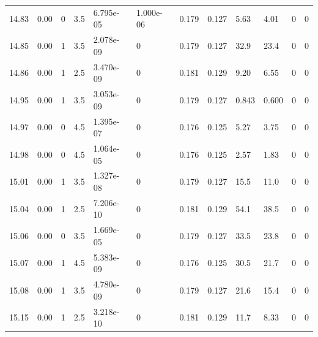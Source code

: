 \documentclass[preview]{standalone}
\begin{document}
{{{{{{{{{{{{{{\begin{tabular}{L{1.2cm}C{1.2cm} C{0.3cm}C{0.5cm} C{1.4cm}C{1.4cm} C{1.4cm}C{1.4cm} C{1.6cm}C{1.6cm} C{1.6cm}C{1.6cm}}
  14.83  &  0.00  & 0     & 3.5 &  6.795e-05  & 1.000e-06  &  0.179&   0.127& 5.63 & 4.01   &  0 & 0  \\ 
  14.85  &  0.00  & 1     & 3.5 &  2.078e-09  & 0  &  0.179&   0.127& 32.9 & 23.4   &  0 & 0  \\ 
  14.86  &  0.00  & 1     & 2.5 &  3.470e-09  & 0  &  0.181&   0.129& 9.20 & 6.55   &  0 & 0  \\ 
  14.95  &  0.00  & 1     & 3.5 &  3.053e-09  & 0  &  0.179&   0.127& 0.843 & 0.600   &  0 & 0  \\ 
  14.97  &  0.00  & 0     & 4.5 &  1.395e-07  & 0  &  0.176&   0.125& 5.27 & 3.75   &  0 & 0  \\ 
  14.98  &  0.00  & 0     & 4.5 &  1.064e-05  & 0  &  0.176&   0.125& 2.57 & 1.83   &  0 & 0  \\ 
  15.01  &  0.00  & 1     & 3.5 &  1.327e-08  & 0  &  0.179&   0.127& 15.5 & 11.0   &  0 & 0  \\ 
  15.04  &  0.00  & 1     & 2.5 &  7.206e-10  & 0  &  0.181&   0.129& 54.1 & 38.5   &  0 & 0  \\ 
  15.06  &  0.00  & 0     & 3.5 &  1.669e-05  & 0  &  0.179&   0.127& 33.5 & 23.8   &  0 & 0  \\ 
  15.07  &  0.00  & 1     & 4.5 &  5.383e-09  & 0  &  0.176&   0.125& 30.5 & 21.7   &  0 & 0  \\ 
  15.08  &  0.00  & 1     & 3.5 &  4.780e-09  & 0  &  0.179&   0.127& 21.6 & 15.4   &  0 & 0  \\ 
  15.15  &  0.00  & 1     & 2.5 &  3.218e-10  & 0  &  0.181&   0.129& 11.7 & 8.33   &  0 & 0  \\ 
\hline 
\end{tabular} 

}}}}}}}}}}}}}}
\end{document}
